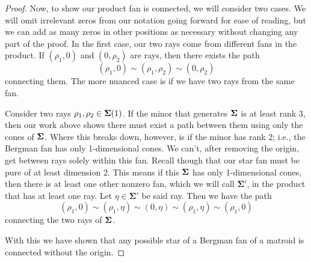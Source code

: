 \documentclass[12pt,oneside]{../../sfsuthesis}
\begin{document}
\begin{proof}
    Now, to show our product fan is connected, we will consider two cases.
    We will omit irrelevant zeros from our notation going forward for ease of reading, but we can add as many zeros in other positions as necessary without changing any part of the proof.
    In the first case, our two rays come from different fans in the product.
    If \( (\rho_1, 0) \) and \( (0, \rho_2) \) are rays, then there exists the path
    \[
        (\rho_1, 0) \sim (\rho_1, \rho_2) \sim (0, \rho_2)
    \]
    connecting them.
    The more nuanced case is if we have two rays from the same fan.

    Consider two rays \( \rho_1, \rho_2 \in {\bm{\Sigma}}(1)\).
    If the minor that generates \( {\bm{\Sigma}} \) is at least rank 3, then our work above shows there must exist a path between them using only the cones of \( {\bm{\Sigma}} \).
    Where this breaks down, however, is if the minor has rank 2; i.e., the Bergman fan has only 1-dimensional cones.
    We can't, after removing the origin, get between rays solely within this fan.
    Recall though that our star fan must be pure of at least dimension 2.
    This means if this \({\bm{\Sigma}} \) has only 1-dimensional cones, then there is at least one other nonzero fan, which we will call \( \bm{\Sigma'} \), in the product that has at least one ray.
    Let \( \eta \in  \bm{\Sigma'} \) be said ray.
    Then we have the path
    \[
        (\rho_1, 0) \sim (\rho_1, \eta) \sim (0, \eta) \sim (\rho_1, \eta) \sim (\rho_1, 0)
    \]
    connecting the two rays of \( {\bm{\Sigma}} \).

    With this we have shown that any possible star of a Bergman fan of a matroid is connected without the origin.
\end{proof}
\end{document}
